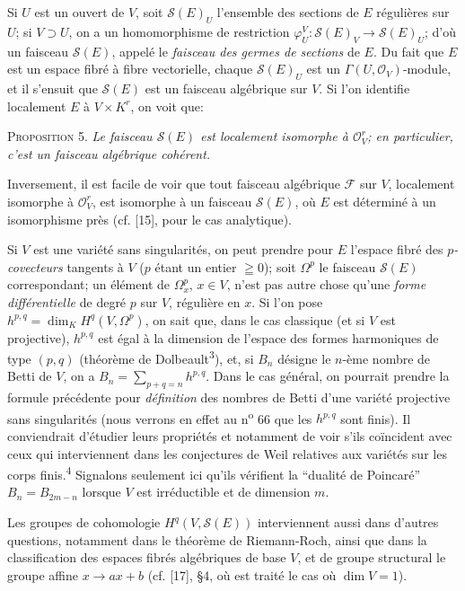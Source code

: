 Si $U$ est un ouvert de $V$, soit $\mathcal{S}(E)_U$ l'ensemble des sections de $E$ régulières sur $U$; si $V \supset U$, on a un homomorphisme de restriction $\varphi_U^V : \mathcal{S}(E)_V \rightarrow \mathcal{S}(E)_U$; d'où un faisceau $\mathcal{S}(E)$, appelé le \textit{faisceau des germes de sections} de $E$. Du fait que $E$ est un espace fibré à fibre vectorielle, chaque $\mathcal{S}(E)_U$ est un $\Gamma(U, \mathcal{O}_V)$-module, et il s'ensuit que $\mathcal{S}(E)$ est un faisceau algébrique sur $V$. Si l'on identifie localement $E$ à $V \times K^r$, on voit que:

\textsc{Proposition} 5. \textit{Le faisceau $\mathcal{S}(E)$ est localement isomorphe à $\mathcal{O}_V^r$; en particulier, c'est un faisceau algébrique cohérent.}

Inversement, il est facile de voir que tout faisceau algébrique $\mathcal{F}$ sur $V$, localement isomorphe à $\mathcal{O}_V^r$, est isomorphe à un faisceau $\mathcal{S}(E)$, où $E$ est déterminé à un isomorphisme près (cf. [15], pour le cas analytique).

Si $V$ est une variété sans singularités, on peut prendre pour $E$ l'espace fibré des \textit{$p$-covecteurs} tangents à $V$ ($p$ étant un entier $\geqq 0$); soit $\Omega^p$ le faisceau $\mathcal{S}(E)$ correspondant; un élément de $\Omega_x^p$, $x \in V$, n'est pas autre chose qu'une \textit{forme différentielle} de degré $p$ sur $V$, régulière en $x$. Si l'on pose $h^{p,q} = \dim_K H^q(V, \Omega^p)$, on sait que, dans le cas classique (et si $V$ est projective), $h^{p,q}$ est égal à la dimension de l'espace des formes harmoniques de type $(p, q)$ (théorème de Dolbeault\textsuperscript{3}), et, si $B_n$ désigne le $n$-ème nombre de Betti de $V$, on a $B_n = \sum_{p+q=n} h^{p,q}$. Dans le cas général, on pourrait prendre la formule précédente pour \textit{définition} des nombres de Betti d'une variété projective sans singularités (nous verrons en effet au n\textsuperscript{o} 66 que les $h^{p,q}$ sont finis). Il conviendrait d'étudier leurs propriétés et notamment de voir s'ils coïncident avec ceux qui interviennent dans les conjectures de Weil relatives aux variétés sur les corps finis.\textsuperscript{4} Signalons seulement ici qu'ils vérifient la ``dualité de Poincaré'' $B_n = B_{2m-n}$ lorsque $V$ est irréductible et de dimension $m$.

Les groupes de cohomologie $H^q(V, \mathcal{S}(E))$ interviennent aussi dans d'autres questions, notamment dans le théorème de Riemann-Roch, ainsi que dans la classification des espaces fibrés algébriques de base $V$, et de groupe structural le groupe affine $x \rightarrow ax + b$ (cf. [17], §4, où est traité le cas où $\dim V = 1$).


